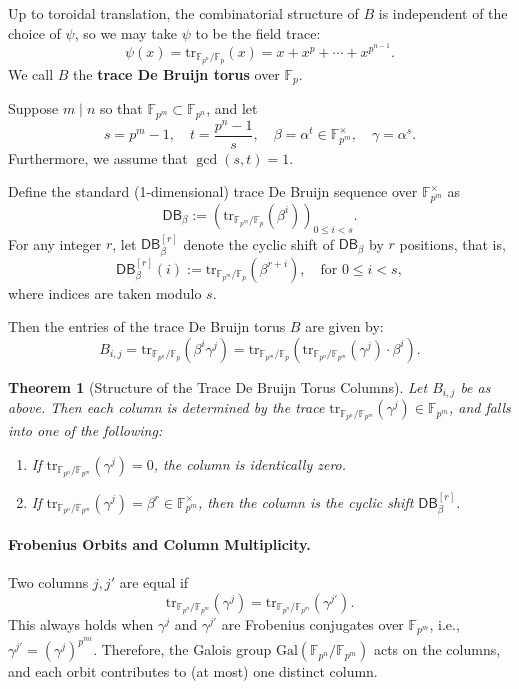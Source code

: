 \documentclass{article}
\newtheorem{theorem}{Theorem}[section]
\begin{document}
Up to toroidal translation, the combinatorial structure of \( B \) is independent of the choice of \( \psi \), so we may take \( \psi \) to be the field trace:
\[
\psi(x) = \mathrm{tr}_{\mathbb{F}_{p^n}/\mathbb{F}_p}(x) = x + x^p + \cdots + x^{p^{n-1}}.
\]
We call \( B \) the \textbf{trace De Bruijn torus} over \( \mathbb{F}_p \).


Suppose \( m \mid n \) so that \( \mathbb{F}_{p^m} \subset \mathbb{F}_{p^n} \), and let
\[
s = p^m - 1, \quad t = \frac{p^n - 1}{s}, \quad \beta = \alpha^t \in \mathbb{F}_{p^m}^\times, \quad \gamma = \alpha^s.
\]
Furthermore, we assume that \(\gcd(s,t)=1\). 

Define the standard (1-dimensional) trace De Bruijn sequence over \( \mathbb{F}_{p^m}^\times \) as
\[
\mathsf{DB}_\beta := \left( \mathrm{tr}_{\mathbb{F}_{p^m}/\mathbb{F}_p}(\beta^i) \right)_{0 \leq i < s}.
\]
For any integer \( r \), let \( \mathsf{DB}_\beta^{[r]} \) denote the cyclic shift of \( \mathsf{DB}_\beta \) by \( r \) positions, that is,
\[
\mathsf{DB}_\beta^{[r]}(i) := \mathrm{tr}_{\mathbb{F}_{p^m}/\mathbb{F}_p}(\beta^{r+i}), \quad \text{for } 0 \le i < s,
\]
where indices are taken modulo \( s \).


Then the entries of the trace De Bruijn torus \( B \) are given by:
\[
B_{i,j} = \mathrm{tr}_{\mathbb{F}_{p^n}/\mathbb{F}_p}(\beta^i \gamma^j) = \mathrm{tr}_{\mathbb{F}_{p^m}/\mathbb{F}_p}\left( \mathrm{tr}_{\mathbb{F}_{p^n}/\mathbb{F}_{p^m}}(\gamma^j) \cdot \beta^i \right).
\]

\begin{theorem}[Structure of the Trace De Bruijn Torus Columns]
Let \( B_{i,j} \) be as above. Then each column is determined by the trace \( \mathrm{tr}_{\mathbb{F}_{p^n}/\mathbb{F}_{p^m}}(\gamma^j) \in \mathbb{F}_{p^m} \), and falls into one of the following:
\begin{enumerate}
    \item If \( \mathrm{tr}_{\mathbb{F}_{p^n}/\mathbb{F}_{p^m}}(\gamma^j) = 0 \), the column is identically zero.
    \item If \( \mathrm{tr}_{\mathbb{F}_{p^n}/\mathbb{F}_{p^m}}(\gamma^j) = \beta^r \in \mathbb{F}_{p^m}^\times \), then the column is the cyclic shift \( \mathsf{DB}_\beta^{[r]} \).
\end{enumerate}
\end{theorem}

\paragraph{Frobenius Orbits and Column Multiplicity.}
Two columns \( j, j' \) are equal if
\[
\mathrm{tr}_{\mathbb{F}_{p^n}/\mathbb{F}_{p^m}}(\gamma^j) = \mathrm{tr}_{\mathbb{F}_{p^n}/\mathbb{F}_{p^m}}(\gamma^{j'}).
\]
This always holds when \( \gamma^j \) and \( \gamma^{j'} \) are Frobenius conjugates over \( \mathbb{F}_{p^m} \), i.e., \( \gamma^{j'} = (\gamma^j)^{p^{mi}} \). Therefore, the Galois group \( \mathrm{Gal}(\mathbb{F}_{p^n}/\mathbb{F}_{p^m}) \) acts on the columns, and each orbit contributes to (at most) one distinct column.
\end{document}
